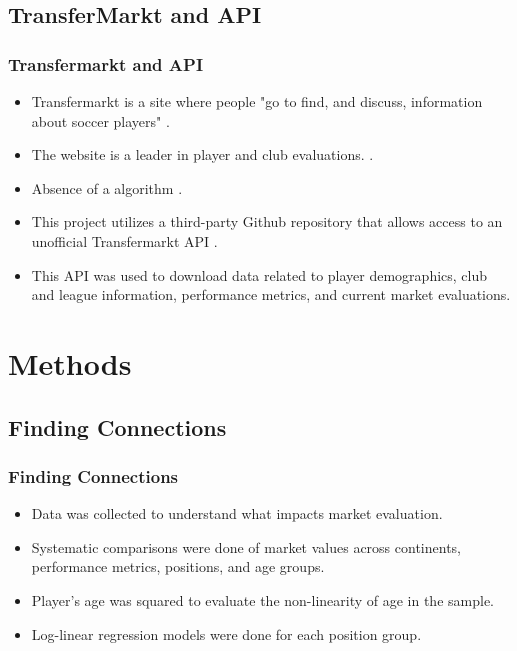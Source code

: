 \documentclass[t,aspectratio=169,xcolor=dvipsnames]{beamer}
\begin{document}
\subsection{TransferMarkt and API}

\begin{frame}

    \frametitle{Transfermarkt and API} 

     \begin{itemize}
        \item Transfermarkt is a site where people "go to find, and discuss, information about soccer players" \citep{Wisdom_Crowd}.
        \item The website is a leader in player and club evaluations. \citep{Wisdom_Crowd}. 
        \item Absence of a algorithm \citep{Wisdom_Crowd}.
        \item This project utilizes a third-party Github repository that allows access to an unofficial Transfermarkt API \citep{GithubAPI}.
        \item This API was used to download data related to player demographics, club and league information, performance metrics, and current market evaluations. 
    \end{itemize}
\end{frame}

\section{Methods}
\subsection{Finding Connections}
\begin{frame}

    \frametitle{Finding Connections} 

     \begin{itemize}   
        \item Data was collected to understand what impacts market evaluation.
        \item Systematic comparisons were done of market values across continents, performance metrics, positions, and age groups. 
        \item Player's age was squared to evaluate the non-linearity of age in the sample. 
        \item Log-linear regression models were done for each position group. 
    \end{itemize}
    

\end{frame}
\end{document}
